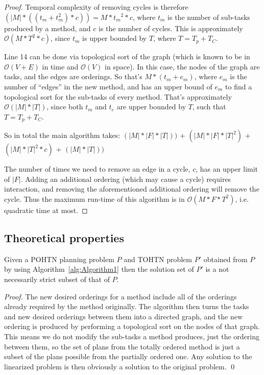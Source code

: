 \documentclass[runningheads]{llncs}
\begin{document}
\begin{proof}
Temporal complexity of removing cycles is therefore $(|M| * ((t_m + t_m^2) * c)) = M * {t_m}^2 * c$, where $t_m$ is the number of sub-tasks produced by a method, and $c$ is the number of cycles.
This is approximately $\mathcal{O}(M * T^2 * c)$, since $t_m$ is upper bounded by $T$, where $T=T_p + T_C$.

Line 14 can be done via topological sort of the graph (which is known to be in $\mathcal{O}(V+E)$ in time and $\mathcal{O}(V)$ in space). In this case, the nodes of the graph are tasks, and the edges are orderings. So that's $M * (t_m+e_m)$, where $e_m$ is the number of \enquote{edges} in the new method, and has an upper bound of $e_m$ to find a topological sort for the sub-tasks of every method. That's approximately $\mathcal{O}(|M| * |T|)$, since both $t_m$ and $t_e$ are upper bounded by $T$, such that $T=T_p + T_C$.

So in total the main algorithm takes: \newline
$(|M| * |F| * |T|))$  +    %
$(|M| * |F| * |T|^2)$ + %
$(|M| * |T|^2 * c)$ +   %
$(|M| * |T|))$        %
 

The number of times we need to remove an edge in a cycle, $c$, has an upper limit of $|F|$.
Adding an additional ordering (which may cause a cycle) requires interaction, and removing the aforementioned additional ordering will remove the cycle. Thus the maximum run-time of this algorithm is in $\mathcal{O}(M * F * T^2)$, i.e. quadratic time at most.
\end{proof}


\subsection{Theoretical properties}
\begin{theorem}\label{thm:Soundness}
	Given a POHTN planning problem $P$ and TOHTN problem
	$P'$ obtained from $P$ by using Algorithm~\ref{alg:Algorithm1}
	then the solution set of $P'$ is a not necessarily strict subset of that of $P$.
\end{theorem}
\begin{proof}
	The new desired orderings for a method include all of the orderings already required by the method originally. The algorithm then turns the tasks and new desired orderings between them into a directed graph, and the new ordering is produced by performing a topological sort on the nodes of that graph. This means we do not modify the sub-tasks a method produces, just the ordering between them, so the set of plans from the totally ordered method is just a subset of the plans possible from the partially ordered one. Any solution to the linearized problem is then obviously a solution to the original problem.
	\qed
\end{proof}
\end{document}
